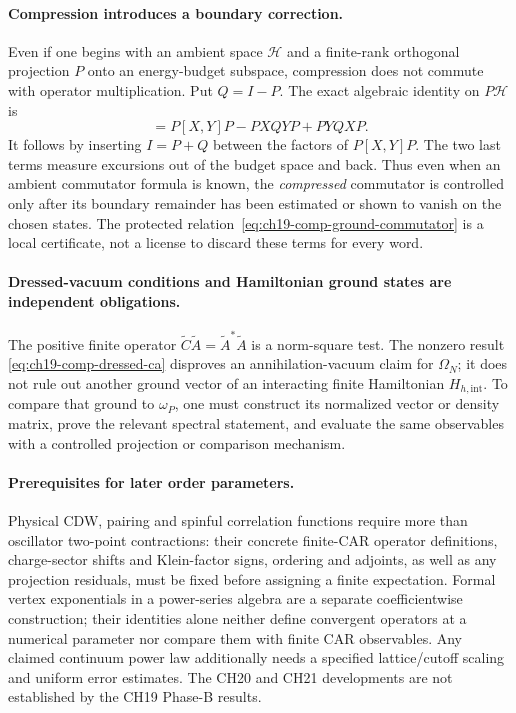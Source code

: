 \paragraph{Compression introduces a boundary correction.}
Even if one begins with an ambient space $\mathcal H$ and a
finite-rank orthogonal projection $P$ onto an energy-budget subspace,
compression does not commute with operator multiplication.  Put
$Q=I-P$.  The exact algebraic identity on $P\mathcal H$ is
\begin{equation}
 [PXP,PYP]
 =P[X,Y]P-PXQYP+PYQXP.
 \label{eq:ch19-comp-compression-identity}
\end{equation}
It follows by inserting $I=P+Q$ between the factors of
$P[X,Y]P$.  The two last terms measure excursions out of the budget
space and back.  Thus even when an ambient commutator formula is known,
the \emph{compressed} commutator is controlled only after its boundary
remainder has been estimated or shown to vanish on the chosen states.
The protected relation~\eqref{eq:ch19-comp-ground-commutator} is a
local certificate, not a license to discard these terms for every word.

\paragraph{Dressed-vacuum conditions and Hamiltonian ground states
are independent obligations.}
The positive finite operator
$\widetilde C\widetilde A=\widetilde A^*\widetilde A$
is a norm-square test.  The nonzero result
\eqref{eq:ch19-comp-dressed-ca} disproves an annihilation-vacuum
claim for $\Omega_N$; it does not rule out another ground vector of
an interacting finite Hamiltonian $H_{h,\mathrm{int}}$.
To compare that ground to $\omega_P$, one must construct its
normalized vector or density matrix, prove the relevant spectral
statement, and evaluate the same observables with a controlled
projection or comparison mechanism.

\paragraph{Prerequisites for later order parameters.}
Physical CDW, pairing and spinful correlation functions require more
than oscillator two-point contractions: their concrete finite-CAR
operator definitions, charge-sector shifts and Klein-factor signs,
ordering and adjoints, as well as any projection residuals, must be
fixed before assigning a finite expectation.  Formal vertex
exponentials in a power-series algebra are a separate coefficientwise
construction; their identities alone neither define convergent
operators at a numerical parameter nor compare them with finite CAR
observables.  Any claimed continuum power law additionally needs a
specified lattice/cutoff scaling and uniform error estimates.
The CH20 and CH21 developments are not established by the CH19
Phase-B results.

